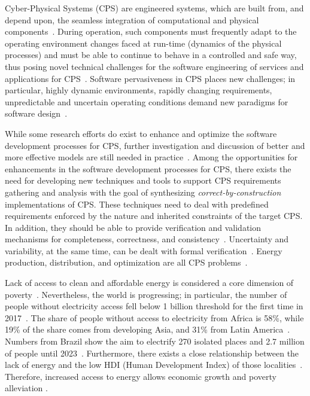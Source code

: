 Cyber-Physical Systems (CPS) are engineered systems, which are built from, and depend upon, the seamless integration of computational and physical  components~\cite{NSF2015,ChavesIBCF19}. During operation, such components must frequently adapt to the operating environment changes faced at run-time (dynamics of the physical processes) and must be able to continue to behave in a controlled and safe way, thus posing novel technical challenges for the software engineering of services and applications for CPS~\cite{Metzger2014}. Software pervasiveness in CPS places new challenges; in particular, highly dynamic environments, rapidly changing requirements, unpredictable and uncertain operating conditions demand new paradigms for software design~\cite{Filieri2015}.

While some research efforts do exist to enhance and optimize the software development processes for CPS, further investigation and discussion of better and more effective models are still needed in practice~\cite{Al-Jaroodi2016}. Among the opportunities for enhancements in the software development processes for CPS, there exists the need for developing new techniques and tools to support CPS requirements gathering and analysis with the goal of synthesizing \textit{correct-by-construction} implementations of CPS. These techniques need to deal with predefined requirements enforced by the nature and inherited constraints of the target CPS. In addition, they should be able to provide verification and validation mechanisms for completeness, correctness, and consistency~\cite{Al-Jaroodi2016}. Uncertainty and variability, at the same time, can be dealt with formal verification~\cite{NESSI}. Energy production, distribution, and optimization are all CPS problems~\cite{UC}. 

Lack of access to clean and affordable energy is considered a core dimension of poverty~\cite{Hussein2012}. Nevertheless, the world is progressing; in particular, the number of people without electricity access fell below 1 billion threshold for the first time in 2017~\cite{IEAweo2018}. The share of people without access to electricity from Africa is 58\%, while 19\% of the share comes from developing Asia, and 31\% from Latin America~\cite{IEAweo2018}. Numbers from Brazil show the aim to electrify 270 isolated places and 2.7 million of people until 2023~\cite{EPE2018}. 
Furthermore, there exists a close relationship between the lack of energy and the low HDI (Human Development Index) of those localities~\cite{Coelho}. Therefore, increased access to energy allows economic growth and poverty alleviation \cite{Karekesi}.

